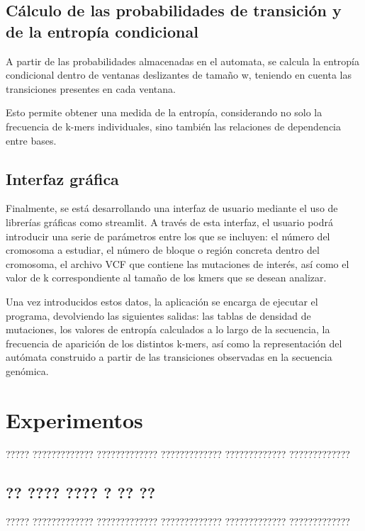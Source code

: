 \documentclass[11pt,spanish,listoffigures,listoftables]{tfgetsinf}
\begin{document}
\section{Cálculo de las probabilidades de transición y de la entropía condicional}

A partir de las probabilidades almacenadas en el automata, se calcula la entropía condicional dentro de ventanas deslizantes de tamaño w, teniendo en cuenta las transiciones presentes en cada ventana.

Esto permite obtener una medida de la entropía, considerando no solo la frecuencia de k-mers individuales, sino también las relaciones de dependencia entre bases.

\section{Interfaz gráfica}

Finalmente, se está desarrollando una interfaz de usuario mediante el uso de librerías gráficas como streamlit. A través de esta interfaz, el usuario podrá introducir una serie de parámetros entre los que se incluyen: el número del cromosoma a estudiar, el número de bloque o región concreta dentro del cromosoma, el archivo VCF que contiene las mutaciones de interés, así como el valor de k correspondiente al tamaño de los kmers que se desean analizar.

Una vez introducidos estos datos, la aplicación se encarga de ejecutar el programa, devolviendo las siguientes salidas: las tablas de densidad de mutaciones, los valores de entropía calculados a lo largo de la secuencia, la frecuencia de aparición de los distintos k-mers, así como la representación del autómata construido a partir de las transiciones observadas en la secuencia genómica.





\chapter{Experimentos}

????? ????????????? ????????????? ????????????? ????????????? ????????????? 

\section{?? ???? ???? ? ?? ??}

????? ????????????? ????????????? ????????????? ????????????? ?????????????
\end{document}
